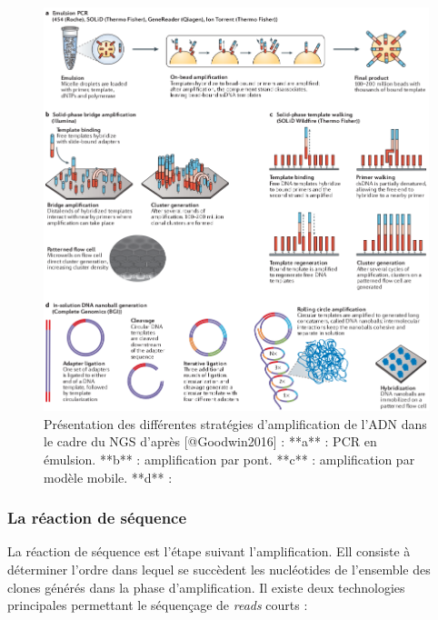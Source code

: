 \documentclass[12pt,twoside]{reedthesis}
\theoremstyle{definition}
\theoremstyle{definition}
\theoremstyle{remark}
\begin{document}
  \newpage 
  
  \begin{figure}
  
  {\centering \includegraphics[scale=.455]{figure/ngs_amplification} 
  
  }
  
  \caption[Présentation des différentes stratégies d'amplification de l'ADN dans le cadre du NGS]{Présentation des différentes stratégies d'amplification de l'ADN dans le cadre du NGS d'après [@Goodwin2016] : **a** : PCR en émulsion. **b** : amplification par pont. **c** : amplification par modèle mobile. **d** : }\label{fig:ngsampli}
  \end{figure}
  
  \newpage
  
  \subsubsection{La réaction de séquence}\label{la-reaction-de-sequence}
  
  La réaction de séquence est l'étape suivant l'amplification. Ell
  consiste à déterminer l'ordre dans lequel se succèdent les nucléotides
  de l'ensemble des clones générés dans la phase d'amplification. Il
  existe deux technologies principales permettant le séquençage de
  \emph{reads} courts :\\
  
\end{document}
